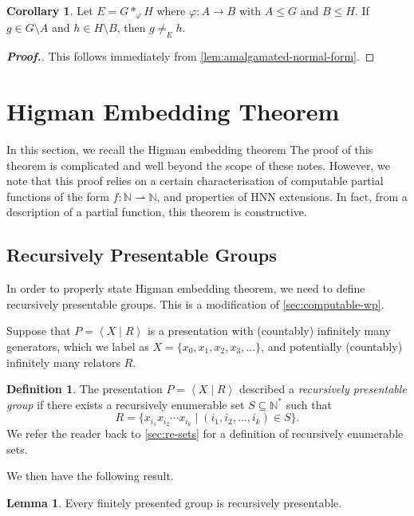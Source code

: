 \documentclass[11pt,a4paper,reqno]{amsart}
\theoremstyle{plain}
\theoremstyle{definition}
\newtheorem{lemma}[theorem]{Lemma}
\newtheorem{corollary}{Corollary}[theorem]
\newtheorem{definition}[theorem]{Definition}
\theoremstyle{definition}
\renewcommand\leq\leqslant
\newenvironment{myproof}{\begin{proof}[\normalfont\bfseries Proof.]}{\end{proof}}
\begin{document}
\begin{corollary}\label{cor:unequal-values}
	Let $E = G *_\varphi H$ where $\varphi\colon A\to B$ with $A\leq G$ and $B \leq H$.
	If $g\in G\setminus A$ and $h \in H \setminus B$, then $g \neq_E h$.
\end{corollary}

\begin{myproof}
  This follows immediately from \cref{lem:amalgamated-normal-form}.
\end{myproof}

\section{Higman Embedding Theorem}

In this section, we recall the Higman embedding theorem
The proof of this theorem is complicated and well beyond the scope of these notes.
However, we note that this proof relies on a certain characterisation of computable partial functions of the form $f\colon \mathbb N \rightharpoonup \mathbb N$, and properties of HNN extensions.
In fact, from a description of a partial function, this theorem is constructive.

\subsection{Recursively Presentable Groups}

In order to properly state Higman embedding theorem, we need to define recursively presentable groups.
This is a modification of \cref{sec:computable-wp}.

Suppose that $P = \left\langle X \mid R\right\rangle$ is a presentation with (countably) infinitely many generators, which we label as $X = \{x_0,x_1,x_2,x_3,\ldots\}$, and potentially (countably) infinitely many relators $R$.

\begin{definition}
  The presentation $P = \left\langle X\mid R\right\rangle$ described a \emph{recursively presentable group} if there exists a recursively enumerable set $S\subseteq \mathbb N^*$ such that
  \[
    R = \{
      x_{i_1} x_{i_2} \cdots x_{i_k}
    \mid
      (i_1,i_2,\ldots,i_k) \in S
    \}.
  \]
  We refer the reader back to \cref{sec:re-sets} for a definition of recursively enumerable sets.
\end{definition}

We then have the following result.
\begin{lemma}\label{lem:fp-implies-rp}
  Every finitely presented group is recursively presentable.
\end{lemma}
\end{document}
